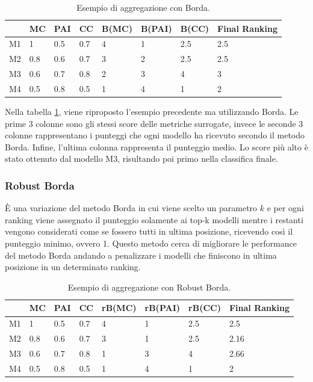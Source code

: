 \begin{table}
	
	\centering
	\begin{tabular}{|l|l|l|l|l|l|l|l|}
		\hline
		   & MC  & PAI & CC  & B(MC) & B(PAI) & B(CC) & Final Ranking \\ \hline
		M1 & 1   & 0.5 & 0.7 & 4     & 1      & 2.5   & 2.5           \\ \hline
		M2 & 0.8 & 0.6 & 0.7 & 3     & 2      & 2.5   & 2.5           \\ \hline
		M3 & 0.6 & 0.7 & 0.8 & 2     & 3      & 4     & 3             \\ \hline
		M4 & 0.5 & 0.8 & 0.5 & 1     & 4      & 1     & 2             \\ \hline
	\end{tabular}
	\caption{\label{borda}Esempio di aggregazione con Borda.}
\end{table}


Nella tabella \ref{borda}, viene riproposto l'esempio precedente ma utilizzando Borda. Le prime 3 colonne sono gli stessi score delle metriche surrogate, invece le seconde 3 colonne rappresentano i punteggi che ogni modello ha ricevuto secondo il metodo Borda. Infine, l'ultima colonna rappresenta il punteggio medio. Lo score più alto è stato ottenuto dal modello M3, risultando poi primo nella classifica finale.
\subsubsection{Robust Borda}
È una variazione del metodo Borda in cui viene scelto un parametro $k$ e per ogni ranking viene assegnato il punteggio solamente ai top-k modelli mentre i restanti vengono considerati come se fossero tutti in ultima posizione, ricevendo così il punteggio minimo, ovvero 1. Questo metodo cerca di migliorare le performance del metodo Borda andando a penalizzare i modelli che finiscono in ultima posizione in un determinato ranking. 

\begin{table}
	
	\centering
	\begin{tabular}{|l|l|l|l|l|l|l|l|}
		\hline
		   & MC  & PAI & CC  & rB(MC) & rB(PAI) & rB(CC) & Final Ranking \\ \hline
		M1 & 1   & 0.5 & 0.7 & 4      & 1       & 2.5    & 2.5           \\ \hline
		M2 & 0.8 & 0.6 & 0.7 & 3      & 1       & 2.5    & 2.16          \\ \hline
		M3 & 0.6 & 0.7 & 0.8 & 1      & 3       & 4      & 2.66          \\ \hline
		M4 & 0.5 & 0.8 & 0.5 & 1      & 4       & 1      & 2             \\ \hline
	\end{tabular}
	\caption{\label{rborda}Esempio di aggregazione con Robust Borda.}
\end{table}

